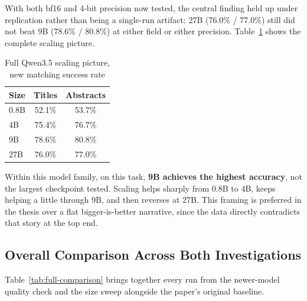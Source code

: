 With both bf16 and 4-bit precision now tested, the central finding held up under replication rather than being a single-run artifact: 27B (76.0\% / 77.0\%) still did not beat 9B (78.6\% / 80.8\%) at either field or either precision. Table~\ref{tab:scaling-full} shows the complete scaling picture.

\begin{table}[h]
\centering
\caption{Full Qwen3.5 scaling picture, new matching success rate}
\label{tab:scaling-full}
\begin{tabular}{lcc}
\toprule
Size & Titles & Abstracts \\
\midrule
0.8B & 52.1\% & 53.7\% \\
4B & 75.4\% & 76.7\% \\
9B & 78.6\% & 80.8\% \\
27B & 76.0\% & 77.0\% \\
\bottomrule
\end{tabular}
\end{table}

Within this model family, on this task, \textbf{9B achieves the highest accuracy}, not the largest checkpoint tested. Scaling helps sharply from 0.8B to 4B, keeps helping a little through 9B, and then reverses at 27B. This framing is preferred in the thesis over a flat bigger-is-better narrative, since the data directly contradicts that story at the top end.

\subsection{Overall Comparison Across Both Investigations}

Table~\ref{tab:full-comparison} brings together every run from the newer-model quality check and the size sweep alongside the paper's original baseline.

